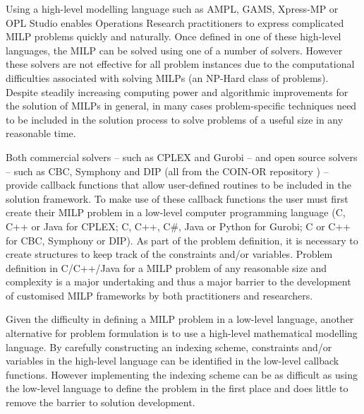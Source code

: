 Using a high-level modelling language such as AMPL, GAMS, Xpress-MP or OPL Studio enables Operations Research practitioners to express complicated \ac{MILP} problems quickly and naturally.
Once defined in one of these high-level languages, the \ac{MILP} can be solved using one of a number of solvers.
However these solvers are not effective for all problem instances due to the computational difficulties associated with solving \ac{MILP}s (an NP-Hard class of problems).
Despite steadily increasing computing power and algorithmic improvements for the solution of \ac{MILP}s in general, in many cases problem-specific techniques need to be included in the solution process to solve problems of a useful size in any reasonable time.

Both commercial solvers -- such as CPLEX and Gurobi -- and open source solvers -- such as CBC, Symphony and \acs{DIP} (all from the COIN-OR repository \cite{coin_or}) -- provide callback functions that allow user-defined routines to be included in the solution framework.
To make use of these callback functions the user must first create their \ac{MILP} problem in a low-level computer programming language (C, C++ or Java for CPLEX; C, C++, C\#, Java or Python for Gurobi; C or C++ for CBC, Symphony or \acs{DIP}).
As part of the problem definition, it is necessary to create structures to keep track of the constraints and\slash{}or variables.
Problem definition in C\slash{}C++\slash{}Java for a \ac{MILP} problem of any reasonable size and complexity is a major undertaking and thus a major barrier to the development of customised \ac{MILP} frameworks by both practitioners and researchers.

Given the difficulty in defining a \ac{MILP} problem in a low-level language, another alternative for problem formulation is to use a high-level mathematical modelling language.
By carefully constructing an indexing scheme, constraints and\slash{}or variables in the high-level language can be identified in the low-level callback functions.
However implementing the indexing scheme can be as difficult as using the low-level language to define the problem in the first place and does little to remove the barrier to solution development.

